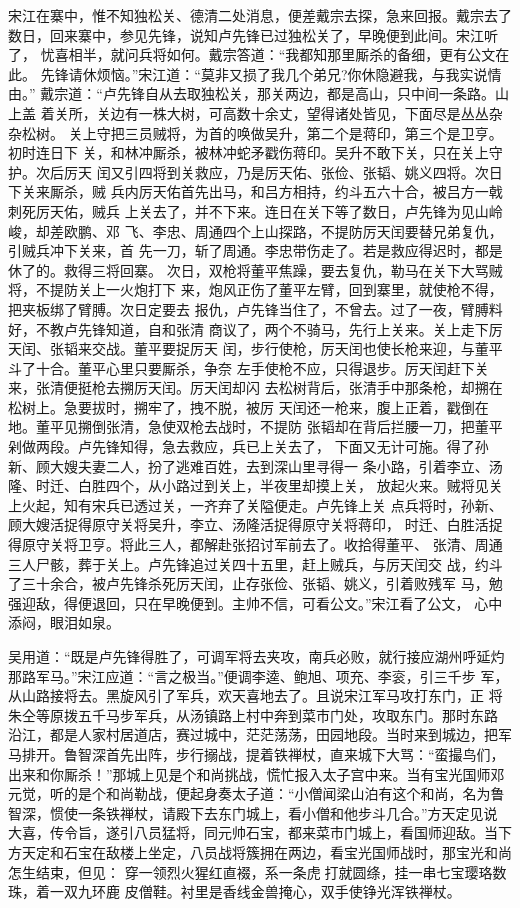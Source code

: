 宋江在寨中，惟不知独松关、德清二处消息，便差戴宗去探，急来回报。戴宗去了
数日，回来寨中，参见先锋，说知卢先锋已过独松关了，早晚便到此间。宋江听了，
忧喜相半，就问兵将如何。戴宗答道：“我都知那里厮杀的备细，更有公文在此。
先锋请休烦恼。”宋江道：“莫非又损了我几个弟兄?你休隐避我，与我实说情由。”
戴宗道：“卢先锋自从去取独松关，那关两边，都是高山，只中间一条路。山上盖
着关所，关边有一株大树，可高数十余丈，望得诸处皆见，下面尽是丛丛杂杂松树。
关上守把三员贼将，为首的唤做吴升，第二个是蒋印，第三个是卫亨。初时连日下
关，和林冲厮杀，被林冲蛇矛戳伤蒋印。吴升不敢下关，只在关上守护。次后厉天
闰又引四将到关救应，乃是厉天佑、张俭、张韬、姚义四将。次日下关来厮杀，贼
兵内厉天佑首先出马，和吕方相持，约斗五六十合，被吕方一戟刺死厉天佑，贼兵
上关去了，并不下来。连日在关下等了数日，卢先锋为见山岭峻，却差欧鹏、邓
飞、李忠、周通四个上山探路，不提防厉天闰要替兄弟复仇，引贼兵冲下关来，首
先一刀，斩了周通。李忠带伤走了。若是救应得迟时，都是休了的。救得三将回寨。
次日，双枪将董平焦躁，要去复仇，勒马在关下大骂贼将，不提防关上一火炮打下
来，炮风正伤了董平左臂，回到寨里，就使枪不得，把夹板绑了臂膊。次日定要去
报仇，卢先锋当住了，不曾去。过了一夜，臂膊料好，不教卢先锋知道，自和张清
商议了，两个不骑马，先行上关来。关上走下厉天闰、张韬来交战。董平要捉厉天
闰，步行使枪，厉天闰也使长枪来迎，与董平斗了十合。董平心里只要厮杀，争奈
左手使枪不应，只得退步。厉天闰赶下关来，张清便挺枪去搠厉天闰。厉天闰却闪
去松树背后，张清手中那条枪，却搠在松树上。急要拔时，搠牢了，拽不脱，被厉
天闰还一枪来，腹上正着，戳倒在地。董平见搠倒张清，急使双枪去战时，不提防
张韬却在背后拦腰一刀，把董平剁做两段。卢先锋知得，急去救应，兵已上关去了，
下面又无计可施。得了孙新、顾大嫂夫妻二人，扮了逃难百姓，去到深山里寻得一
条小路，引着李立、汤隆、时迁、白胜四个，从小路过到关上，半夜里却摸上关，
放起火来。贼将见关上火起，知有宋兵已透过关，一齐弃了关隘便走。卢先锋上关
点兵将时，孙新、顾大嫂活捉得原守关将吴升，李立、汤隆活捉得原守关将蒋印，
时迁、白胜活捉得原守关将卫亨。将此三人，都解赴张招讨军前去了。收拾得董平、
张清、周通三人尸骸，葬于关上。卢先锋追过关四十五里，赶上贼兵，与厉天闰交
战，约斗了三十余合，被卢先锋杀死厉天闰，止存张俭、张韬、姚义，引着败残军
马，勉强迎敌，得便退回，只在早晚便到。主帅不信，可看公文。”宋江看了公文，
心中添闷，眼泪如泉。

吴用道：“既是卢先锋得胜了，可调军将去夹攻，南兵必败，就行接应湖州呼延灼
那路军马。”宋江应道：“言之极当。”便调李逵、鲍旭、项充、李衮，引三千步
军，从山路接将去。黑旋风引了军兵，欢天喜地去了。且说宋江军马攻打东门，正
将朱仝等原拨五千马步军兵，从汤镇路上村中奔到菜市门处，攻取东门。那时东路
沿江，都是人家村居道店，赛过城中，茫茫荡荡，田园地段。当时来到城边，把军
马排开。鲁智深首先出阵，步行搦战，提着铁禅杖，直来城下大骂：“蛮撮鸟们，
出来和你厮杀！”那城上见是个和尚挑战，慌忙报入太子宫中来。当有宝光国师邓
元觉，听的是个和尚勒战，便起身奏太子道：“小僧闻梁山泊有这个和尚，名为鲁
智深，惯使一条铁禅杖，请殿下去东门城上，看小僧和他步斗几合。”方天定见说
大喜，传令旨，遂引八员猛将，同元帅石宝，都来菜市门城上，看国师迎敌。当下
方天定和石宝在敌楼上坐定，八员战将簇拥在两边，看宝光国师战时，那宝光和尚
怎生结束，但见：
穿一领烈火猩红直裰，系一条虎打就圆绦，挂一串七宝璎珞数珠，着一双九环鹿
皮僧鞋。衬里是香线金兽掩心，双手使铮光浑铁禅杖。

